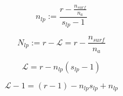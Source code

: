 \documentclass[12pt,letterpaper]{article}
\newcommand{\leng}{\mathcal{L}}
\begin{document}
\begin{equation}
	n_{lp}:= \frac{r-\frac{n_{surf}}{n_a}}{s_{lp}-1}
	\label{eq.nlp}
\end{equation}



\begin{equation}
    N_{lp}:=r-\leng=r-\frac{n_{surf}}{n_a}
	\label{eq.mean_nlp}
\end{equation}



%
\begin{equation}
\leng
=
r 
- 
n_{lp}
(s_{lp}-1)
\label{eq.lengminus}
\end{equation}


%
\begin{equation}
\leng
-
1
=
(r-1) 
- 
n_{lp}
s_{lp}
+ 
n_{lp}
\label{Eq: leng}
\end{equation}





\end{document}
